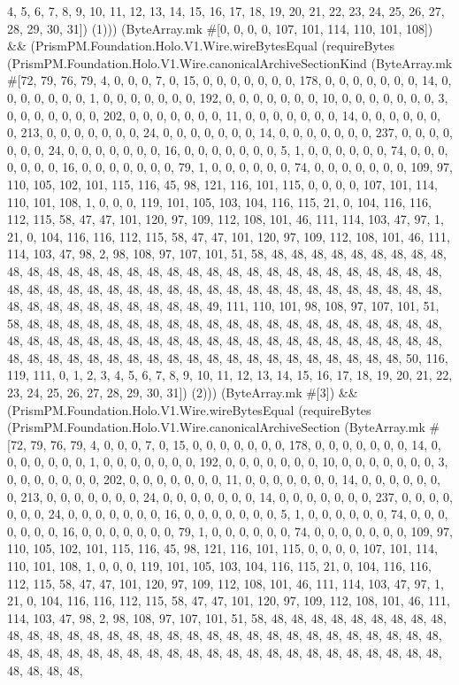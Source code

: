 \documentclass[11pt]{article}
\begin{document}
4, 5, 6, 7, 8, 9, 10, 11, 12, 13, 14, 15, 16, 17, 18, 19, 20, 21, 22, 23, 24, 25, 26, 27, 28, 29, 30, 31]) (1))) (ByteArray.mk \#[0, 0, 0, 0, 107, 101, 114, 110, 101, 108]) \&\& (PrismPM.Foundation.Holo.V1.Wire.wireBytesEqual (requireBytes (PrismPM.Foundation.Holo.V1.Wire.canonicalArchiveSectionKind (ByteArray.mk \#[72, 79, 76, 79, 4, 0, 0, 0, 7, 0, 15, 0, 0, 0, 0, 0, 0, 0, 178, 0, 0, 0, 0, 0, 0, 0, 14, 0, 0, 0, 0, 0, 0, 0, 1, 0, 0, 0, 0, 0, 0, 0, 192, 0, 0, 0, 0, 0, 0, 0, 10, 0, 0, 0, 0, 0, 0, 0, 3, 0, 0, 0, 0, 0, 0, 0, 202, 0, 0, 0, 0, 0, 0, 0, 11, 0, 0, 0, 0, 0, 0, 0, 14, 0, 0, 0, 0, 0, 0, 0, 213, 0, 0, 0, 0, 0, 0, 0, 24, 0, 0, 0, 0, 0, 0, 0, 14, 0, 0, 0, 0, 0, 0, 0, 237, 0, 0, 0, 0, 0, 0, 0, 24, 0, 0, 0, 0, 0, 0, 0, 16, 0, 0, 0, 0, 0, 0, 0, 5, 1, 0, 0, 0, 0, 0, 0, 74, 0, 0, 0, 0, 0, 0, 0, 16, 0, 0, 0, 0, 0, 0, 0, 79, 1, 0, 0, 0, 0, 0, 0, 74, 0, 0, 0, 0, 0, 0, 0, 109, 97, 110, 105, 102, 101, 115, 116, 45, 98, 121, 116, 101, 115, 0, 0, 0, 0, 107, 101, 114, 110, 101, 108, 1, 0, 0, 0, 119, 101, 105, 103, 104, 116, 115, 21, 0, 104, 116, 116, 112, 115, 58, 47, 47, 101, 120, 97, 109, 112, 108, 101, 46, 111, 114, 103, 47, 97, 1, 21, 0, 104, 116, 116, 112, 115, 58, 47, 47, 101, 120, 97, 109, 112, 108, 101, 46, 111, 114, 103, 47, 98, 2, 98, 108, 97, 107, 101, 51, 58, 48, 48, 48, 48, 48, 48, 48, 48, 48, 48, 48, 48, 48, 48, 48, 48, 48, 48, 48, 48, 48, 48, 48, 48, 48, 48, 48, 48, 48, 48, 48, 48, 48, 48, 48, 48, 48, 48, 48, 48, 48, 48, 48, 48, 48, 48, 48, 48, 48, 48, 48, 48, 48, 48, 48, 48, 48, 48, 48, 48, 48, 48, 48, 49, 111, 110, 101, 98, 108, 97, 107, 101, 51, 58, 48, 48, 48, 48, 48, 48, 48, 48, 48, 48, 48, 48, 48, 48, 48, 48, 48, 48, 48, 48, 48, 48, 48, 48, 48, 48, 48, 48, 48, 48, 48, 48, 48, 48, 48, 48, 48, 48, 48, 48, 48, 48, 48, 48, 48, 48, 48, 48, 48, 48, 48, 48, 48, 48, 48, 48, 48, 48, 48, 48, 48, 48, 48, 50, 116, 119, 111, 0, 1, 2, 3, 4, 5, 6, 7, 8, 9, 10, 11, 12, 13, 14, 15, 16, 17, 18, 19, 20, 21, 22, 23, 24, 25, 26, 27, 28, 29, 30, 31]) (2))) (ByteArray.mk \#[3]) \&\& (PrismPM.Foundation.Holo.V1.Wire.wireBytesEqual (requireBytes (PrismPM.Foundation.Holo.V1.Wire.canonicalArchiveSection (ByteArray.mk \#[72, 79, 76, 79, 4, 0, 0, 0, 7, 0, 15, 0, 0, 0, 0, 0, 0, 0, 178, 0, 0, 0, 0, 0, 0, 0, 14, 0, 0, 0, 0, 0, 0, 0, 1, 0, 0, 0, 0, 0, 0, 0, 192, 0, 0, 0, 0, 0, 0, 0, 10, 0, 0, 0, 0, 0, 0, 0, 3, 0, 0, 0, 0, 0, 0, 0, 202, 0, 0, 0, 0, 0, 0, 0, 11, 0, 0, 0, 0, 0, 0, 0, 14, 0, 0, 0, 0, 0, 0, 0, 213, 0, 0, 0, 0, 0, 0, 0, 24, 0, 0, 0, 0, 0, 0, 0, 14, 0, 0, 0, 0, 0, 0, 0, 237, 0, 0, 0, 0, 0, 0, 0, 24, 0, 0, 0, 0, 0, 0, 0, 16, 0, 0, 0, 0, 0, 0, 0, 5, 1, 0, 0, 0, 0, 0, 0, 74, 0, 0, 0, 0, 0, 0, 0, 16, 0, 0, 0, 0, 0, 0, 0, 79, 1, 0, 0, 0, 0, 0, 0, 74, 0, 0, 0, 0, 0, 0, 0, 109, 97, 110, 105, 102, 101, 115, 116, 45, 98, 121, 116, 101, 115, 0, 0, 0, 0, 107, 101, 114, 110, 101, 108, 1, 0, 0, 0, 119, 101, 105, 103, 104, 116, 115, 21, 0, 104, 116, 116, 112, 115, 58, 47, 47, 101, 120, 97, 109, 112, 108, 101, 46, 111, 114, 103, 47, 97, 1, 21, 0, 104, 116, 116, 112, 115, 58, 47, 47, 101, 120, 97, 109, 112, 108, 101, 46, 111, 114, 103, 47, 98, 2, 98, 108, 97, 107, 101, 51, 58, 48, 48, 48, 48, 48, 48, 48, 48, 48, 48, 48, 48, 48, 48, 48, 48, 48, 48, 48, 48, 48, 48, 48, 48, 48, 48, 48, 48, 48, 48, 48, 48, 48, 48, 48, 48, 48, 48, 48, 48, 48, 48, 48, 48, 48, 48, 48, 48, 48, 48, 48, 48, 48, 48, 48, 48, 48, 
\end{document}
